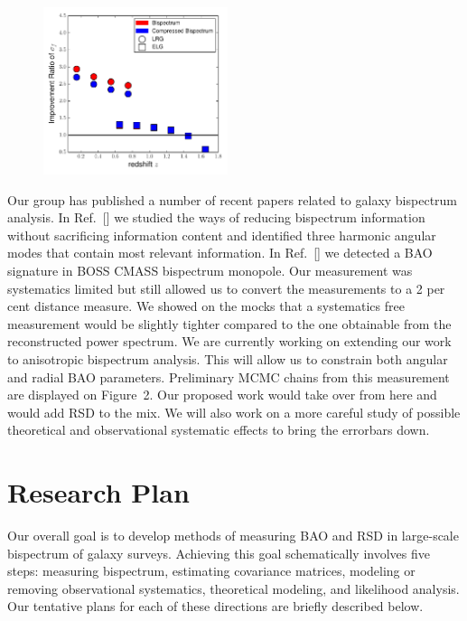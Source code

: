\begin{figure}
\begin{center}
\includegraphics[width=0.48\textwidth]{fz.pdf}
\end{center}
\end{figure}
Our group has published a number of recent papers related to galaxy bispectrum
analysis. In Ref.~[] we studied the ways of reducing bispectrum information
without sacrificing information content and identified three harmonic angular
modes that contain most relevant information. In Ref.~[] we detected a BAO
signature in BOSS CMASS bispectrum monopole. Our measurement was systematics
limited but still allowed us to convert the measurements to a 2 per cent
distance measure. We showed on the mocks that a systematics free measurement
would be slightly tighter compared to the one obtainable from the reconstructed
power spectrum. We are currently working on extending our work to anisotropic
bispectrum analysis. This will allow us to constrain both angular and radial
BAO parameters. Preliminary MCMC chains from this measurement are displayed on
Figure~2. Our proposed work would take over from here and would add RSD to the
mix. We will also work on a more careful study of possible theoretical and
observational systematic effects to bring the errorbars down.


\section{Research Plan}

Our overall goal is to develop methods of measuring BAO and RSD in large-scale
bispectrum of galaxy surveys. Achieving this goal schematically involves five
steps: measuring bispectrum, estimating covariance matrices, modeling or
removing observational systematics, theoretical modeling, and likelihood
analysis. Our tentative plans for each of these directions are briefly
described below.

